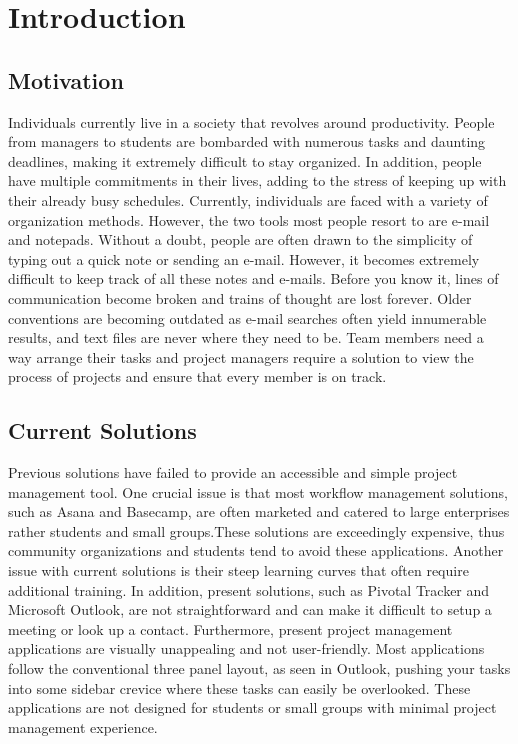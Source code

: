 \chapter{Introduction}

\section{Motivation}

Individuals currently live in a society that revolves around productivity. People from managers to students are bombarded with numerous tasks and daunting deadlines, making it extremely difficult to stay organized. In addition, people have multiple commitments in their lives, adding to the stress of keeping up with their already busy schedules. Currently, individuals are faced with a variety of organization methods. However, the two tools most people resort to are e-mail and notepads. Without a doubt, people are often drawn to the simplicity of typing out a quick note or sending an e-mail. However, it becomes extremely difficult to keep track of all these notes and e-mails. Before you know it, lines of communication become broken and trains of thought are lost forever. Older conventions are becoming outdated as e-mail searches often yield innumerable results, and text files are never where they need to be. Team members need a way arrange their tasks and project managers require a solution to view the process of projects and ensure that every member is on track. 

\section{Current Solutions} 

Previous solutions have failed to provide an accessible and simple project management tool. One crucial issue is that most workflow management solutions, such as Asana and Basecamp, are often marketed and catered to large enterprises rather students and small groups.These solutions are exceedingly expensive, thus community organizations and students tend to avoid these applications. Another issue with current solutions is their steep learning curves that often require additional training. In addition, present solutions, such as Pivotal Tracker and Microsoft Outlook, are not straightforward and can make it difficult to setup a meeting or look up a contact. Furthermore, present project management applications are visually unappealing and not user-friendly. Most applications follow the conventional three panel layout, as seen in Outlook, pushing your tasks into some sidebar crevice where these tasks can easily be overlooked. These applications are not designed for students or small groups with minimal project management experience.

